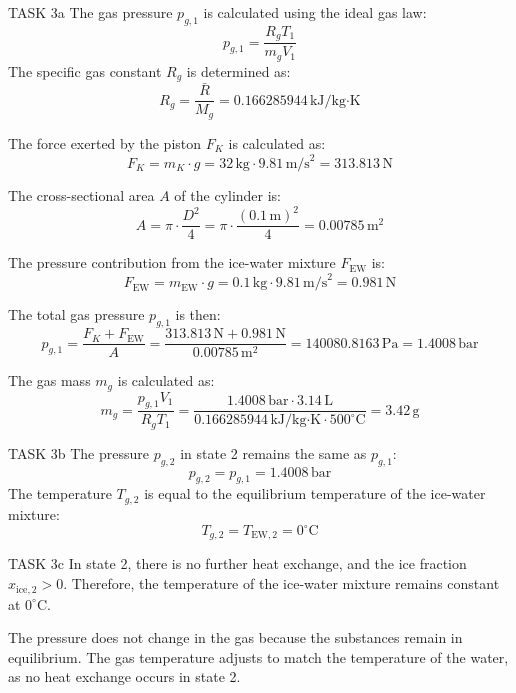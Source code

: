 TASK 3a  
The gas pressure \( p_{g,1} \) is calculated using the ideal gas law:  
\[
p_{g,1} = \frac{R_g T_1}{m_g V_1}
\]  
The specific gas constant \( R_g \) is determined as:  
\[
R_g = \frac{\bar{R}}{M_g} = 0.166285944 \, \text{kJ/kg·K}
\]  

The force exerted by the piston \( F_K \) is calculated as:  
\[
F_K = m_K \cdot g = 32 \, \text{kg} \cdot 9.81 \, \text{m/s}^2 = 313.813 \, \text{N}
\]  

The cross-sectional area \( A \) of the cylinder is:  
\[
A = \pi \cdot \frac{D^2}{4} = \pi \cdot \frac{(0.1 \, \text{m})^2}{4} = 0.00785 \, \text{m}^2
\]  

The pressure contribution from the ice-water mixture \( F_{\text{EW}} \) is:  
\[
F_{\text{EW}} = m_{\text{EW}} \cdot g = 0.1 \, \text{kg} \cdot 9.81 \, \text{m/s}^2 = 0.981 \, \text{N}
\]  

The total gas pressure \( p_{g,1} \) is then:  
\[
p_{g,1} = \frac{F_K + F_{\text{EW}}}{A} = \frac{313.813 \, \text{N} + 0.981 \, \text{N}}{0.00785 \, \text{m}^2} = 140080.8163 \, \text{Pa} = 1.4008 \, \text{bar}
\]  

The gas mass \( m_g \) is calculated as:  
\[
m_g = \frac{p_{g,1} V_1}{R_g T_1} = \frac{1.4008 \, \text{bar} \cdot 3.14 \, \text{L}}{0.166285944 \, \text{kJ/kg·K} \cdot 500^\circ\text{C}} = 3.42 \, \text{g}
\]  

TASK 3b  
The pressure \( p_{g,2} \) in state 2 remains the same as \( p_{g,1} \):  
\[
p_{g,2} = p_{g,1} = 1.4008 \, \text{bar}
\]  
The temperature \( T_{g,2} \) is equal to the equilibrium temperature of the ice-water mixture:  
\[
T_{g,2} = T_{\text{EW},2} = 0^\circ\text{C}
\]  

TASK 3c  
In state 2, there is no further heat exchange, and the ice fraction \( x_{\text{ice},2} > 0 \). Therefore, the temperature of the ice-water mixture remains constant at \( 0^\circ\text{C} \).  

The pressure does not change in the gas because the substances remain in equilibrium. The gas temperature adjusts to match the temperature of the water, as no heat exchange occurs in state 2.
